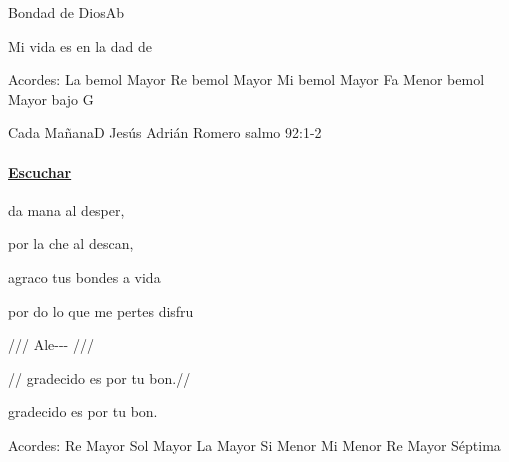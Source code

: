 \documentclass[12pt, spanish]{book}
\newcommand{\NotCCLIed}{\relax}
\begin{document}
\begin{song}{Bondad de Dios}{Ab}
\begin{SBOpGroup}
            Mi vida es en la dad de 
        \end{SBOpGroup}

        \ifChordBk
        \begin{SBOpGroup}
            Acordes:
            \upchord{\Aflat}\qquad La bemol Mayor \hfill
            \upchord{\Dflat}\qquad Re bemol Mayor  \hfill\null\break
            \upchord{\Eflat}\qquad Mi bemol Mayor \hfill
            \upchord{\Fm}\qquad Fa Menor \hfill\null\break
             bemol Mayor bajo G \hfill\null\break
        \end{SBOpGroup}
        \fi
    \end{song}

    \begin{song}{Cada Mañana}{D}
    {} %
    {Jesús Adrián Romero}
    {salmo 92:1-2} %
    {} %
        \ifChordBk
        \paragraph{\mbox{}\hfill\protect\href{https://open.spotify.com/intl-es/track/0AazdjQf5l6Wtih13ya0Se}{Escuchar}\mbox{}\hfill}
        \fi


        \begin{SBOpGroup}
            da mana al desper,

             por la che al descan,

            agraco tus bondes a  vida

            por do lo que me pertes disfru
        \end{SBOpGroup}

        \begin{SBChorus}
            /// Ale--- ///

            // gradecido es por tu bon.//

            gradecido es por tu bon.
        \end{SBChorus}

        \ifChordBk
        \begin{SBOpGroup}
            Acordes:
            \upchord{\D}\qquad Re Mayor \hfill
            \upchord{\G}\qquad Sol Mayor \hfill\null\break
            \upchord{\A}\qquad La Mayor \hfill
            \upchord{\Bm}\qquad Si Menor \hfill\null\break
            \upchord{\Em}\qquad Mi Menor \hfill
            \upchord{\Dseven}\qquad Re Mayor S\'eptima \hfill\null\break
        \end{SBOpGroup}
        \fi
    \end{song}
\end{document}

